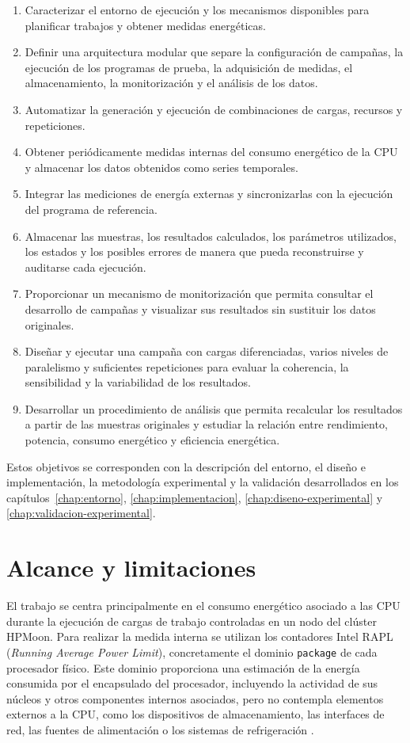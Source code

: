 \begin{enumerate}
    \item Caracterizar el entorno de ejecución y los mecanismos disponibles para planificar trabajos y obtener medidas energéticas.
    \item Definir una arquitectura modular que separe la configuración de campañas, la ejecución de los programas de prueba, la adquisición de medidas, el almacenamiento, la monitorización y el análisis de los datos.
    \item Automatizar la generación y ejecución de combinaciones de cargas, recursos y repeticiones.
    \item Obtener periódicamente medidas internas del consumo energético de la CPU y almacenar los datos obtenidos como series temporales.
    \item Integrar las mediciones de energía externas y sincronizarlas con la ejecución del programa de referencia.
    \item Almacenar las muestras, los resultados calculados, los parámetros utilizados, los estados y los posibles errores de manera que pueda reconstruirse y auditarse cada ejecución.
    \item Proporcionar un mecanismo de monitorización que permita consultar el desarrollo de campañas y visualizar sus resultados sin sustituir los datos originales.
    \item Diseñar y ejecutar una campaña con cargas diferenciadas, varios niveles de paralelismo y suficientes repeticiones para evaluar la coherencia, la sensibilidad y la variabilidad de los resultados.
    \item Desarrollar un procedimiento de análisis que permita recalcular los resultados a partir de las muestras originales y estudiar la relación entre rendimiento, potencia, consumo energético y eficiencia energética.
\end{enumerate}

Estos objetivos se corresponden con la descripción del entorno, el diseño e implementación, la metodología experimental y la validación desarrollados en los capítulos~\ref{chap:entorno}, \ref{chap:implementacion}, \ref{chap:diseno-experimental} y \ref{chap:validacion-experimental}.

\section{Alcance y limitaciones}
\label{sec:introduccion_alcance}

El trabajo se centra principalmente en el consumo energético asociado a las CPU durante la ejecución de cargas de trabajo controladas en un nodo del clúster HPMoon. Para realizar la medida interna se utilizan los contadores Intel RAPL (\textit{Running Average Power Limit}), concretamente el dominio \texttt{package} de cada procesador físico. Este dominio proporciona una estimación de la energía consumida por el encapsulado del procesador, incluyendo la actividad de sus núcleos y otros componentes internos asociados, pero no contempla elementos externos a la CPU, como los dispositivos de almacenamiento, las interfaces de red, las fuentes de alimentación o los sistemas de refrigeración \parencite{khan2018Rapl,linuxPowercap}.

